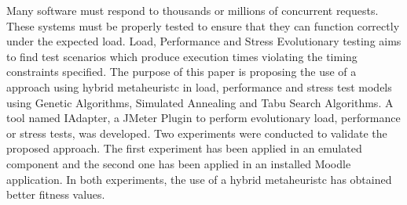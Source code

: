 Many software must respond to  thousands or millions of concurrent requests. 
These systems must be properly tested to ensure that they can function correctly under the expected load.  
Load, Performance and Stress Evolutionary testing aims to find test scenarios which produce execution times violating the timing constraints specified. 
The purpose of this paper is proposing the use of a approach using hybrid metaheuristc in load, performance and stress test models using Genetic Algorithms, Simulated Annealing and Tabu Search Algorithms. A tool named IAdapter, a JMeter Plugin to perform evolutionary load, performance or stress tests, was developed. Two experiments were conducted to validate the proposed approach. The first experiment has been applied in an emulated component and the second one has been applied in an installed Moodle application. In both experiments, the use of a hybrid metaheuristc has obtained better fitness values.
%
% 
%

%
%
